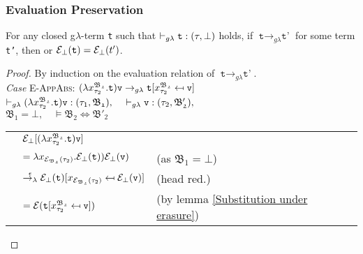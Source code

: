 \subsubsection{Evaluation Preservation}
\theoremstyle{remark}
\begin{theorem}
	For any closed g$\lambda$-term \texttt{t} such that
	$\vdash_{g\lambda} \texttt{t} : (\tau, \bot)$ holds, 
	if	$\texttt{t} \rightarrow_{g\lambda} \texttt{t'}$ for some term \texttt{t'}, then
	 or $\mathcal{E}_{\bot}(\texttt{t}) = \mathcal{E}_{\bot}(t')$. 
\end{theorem}
\begin{proof} By induction on the evaluation relation of $\texttt{t} \rightarrow_{g\lambda} \texttt{t'}$. \\

\noindent\textit{Case} \textsc{E-AppAbs}: \qquad
$(\lambda x^{\mathfrak{B_{2}}}_{\tau_{2}}.\texttt{t})\texttt{v} 
\rightarrow_{g\lambda} \texttt{t} [x^{\mathfrak{B_{2}}}_{\tau_{2}} \mapsfrom \texttt{v}]$ \\
 $\vdash_{g\lambda} (\lambda x^{\mathfrak{B_{2}}}_{\tau_{2}}.\texttt{t})\texttt{v} : (\tau_{1}, \mathfrak{B_{1}}), \quad$
$\vdash_{g\lambda} \texttt{v} : (\tau_{2}, \mathfrak{B'_{2}}), $ \\
$ \mathfrak{B_{1}} = \bot,  \quad 
\vDash\mathfrak{B_{2}} \Leftrightarrow \mathfrak{B'_{2}} $ \\

\begin{center}
\begin{tabular}{lll}
   & $\mathcal{E}_{\bot}[(\lambda x^{\mathfrak{B_{2}}}_{\tau_{2}}.\texttt{t})\texttt{v}]$ &\\
   & $ = \lambda x_{\mathcal{E}_{\mathfrak{B_{2}}}(\tau_{2})}. \mathcal{E}_{\bot}(\texttt{t}))\mathcal{E}_{\bot}(\texttt{v})$ 
   & (as $ \mathfrak{B_{1}} = \bot $)  \\
   &  $ \stackrel{\epsilon}{\rightarrow_{\lambda}} 
   \mathcal{E}_{\bot}(\texttt{t}) [x_{\mathcal{E}_{\mathfrak{B_{2}}}(\tau_{2})} \mapsfrom \mathcal{E}_{\bot}(\texttt{v})]$ & (head red.) \\
   & $ = \mathcal{E}(\texttt{t} [x^{\mathfrak{B_{2}}}_{\tau_{2}} \mapsfrom \texttt{v}]) $ 
   & (by lemma \ref{Substitution under erasure})

 \end{tabular}
  \end{center}


\end{proof}
